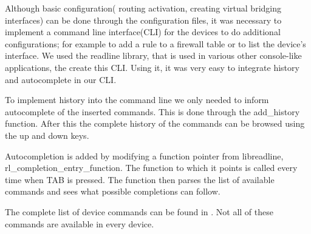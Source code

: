 Although basic configuration( routing activation, creating virtual bridging interfaces) can be done through the 
configuration files, it was necessary to implement a command line interface(CLI) for the devices to do additional configurations; 
for example to add a rule to a firewall table or to list the device's interface. We used the readline library, that is used in various
other console-like applications, the create this CLI. Using it, it was very easy to integrate history and autocomplete in our CLI.

To implement history into the command line we only needed to inform autocomplete of the inserted commands. This is done through the
add_history function. After this the complete history of the commands can be browsed using the up and down keys.

Autocompletion is added by modifying a function pointer from libreadline, rl_completion_entry_function. The function to which it points
is called every time when TAB is pressed. The function then parses the list of available commands and sees what possible completions
can follow. 

The complete list of device commands can be found in . Not all of these commands are available in every device.

